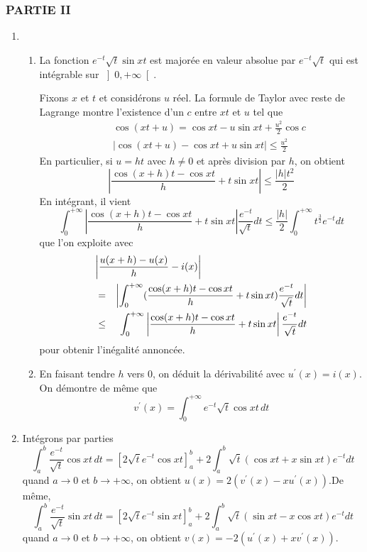 \subsubsection*{PARTIE II}

\begin{enumerate}
\item
\begin{enumerate}
\item  La fonction $e^{-t}\sqrt{t}\sin xt$ est major{\'e}e en valeur absolue
par $e^{-t}\sqrt{t}$ qui est int{\'e}grable sur $\left] 0,+\infty
\right[ $.

Fixons $x$ et $t$ et consid{\'e}rons $u$ r{\'e}el. La formule de Taylor
avec reste de Lagrange montre l'existence d'un $c$ entre $xt$ et
$u$ tel que
\begin{eqnarray*}
&&\cos (xt+u)=\cos xt-u\sin xt+\frac{u^{2}}{2}\cos c \\
&&\left| \cos (xt+u)-\cos xt+u\sin xt\right| \leq \frac{u^{2}}{2}
\end{eqnarray*}
En particulier, si $u=ht$ avec $h\neq 0$ et apr{\`e}s division par
$h$, on obtient
\[
\left| \frac{\cos (x+h)t-\cos xt}{h}+t\sin xt\right| \leq
\frac{\left| h\right| t^{2}}{2}
\]
En int{\'e}grant, il vient
\[
\int_{0}^{+\infty }\left| \frac{\cos (x+h)t-\cos xt}{h}+t\sin
xt\right| \frac{e^{-t}}{\sqrt{t}}dt\leq \frac{\left| h\right|
}{2}\int_{0}^{+\infty }t^{\frac{3}{2}}e^{-t}dt
\]
que l'on exploite avec
\begin{eqnarray*}
\lefteqn{\left| \frac{u(x+h)-u(x)}{h}-i(x)\right|}\\
&=&\left| \int_{0}^{+\infty }(\frac{%
\cos (x+h)t-\cos xt}{h}+t\sin xt)\frac{e^{-t}}{\sqrt{t}}dt\right| \\
&\leq & \int_{0}^{+\infty }\left| \frac{\cos (x+h)t-\cos
xt}{h}+t\sin xt\right| \frac{e^{-t}}{\sqrt{t}}dt
\end{eqnarray*}
pour obtenir l'in{\'e}galit{\'e} annonc{\'e}e.

\item  En faisant tendre $h$ vers $0$, on d{\'e}duit la d{\'e}rivabilit{\'e}
avec $u^{\prime }(x)=i(x)$. On d{\'e}montre de m{\^e}me que
\[
v^{\prime }(x)=\int_{0}^{+\infty }e^{-t}\sqrt{t}\cos xt\,dt
\]
\end{enumerate}

\item  Int{\'e}grons par parties
\[
\int_{a}^{b}\frac{e^{-t}}{\sqrt{t}}\cos xt\,dt=\left[
2\sqrt{t}e^{-t}\cos xt\right] _{a}^{b}+2\int_{a}^{b}\sqrt{t}(\cos
xt+x\sin xt)e^{-t}dt
\]
quand $a\rightarrow 0$ et $b\rightarrow +\infty $, on obtient $%
u(x)=2(v^{\prime }(x)-xu^{\prime }(x))$.\newline De m{\^e}me,
\[
\int_{a}^{b}\frac{e^{-t}}{\sqrt{t}}\sin xt\,dt=\left[
2\sqrt{t}e^{-t}\sin xt\right] _{a}^{b}+2\int_{a}^{b}\sqrt{t}(\sin
xt-x\cos xt)e^{-t}dt
\]
quand $a\rightarrow 0$ et $b\rightarrow +\infty $, on obtient $%
v(x)=-2(u^{\prime }(x)+xv^{\prime }(x))$.


\end{enumerate}
